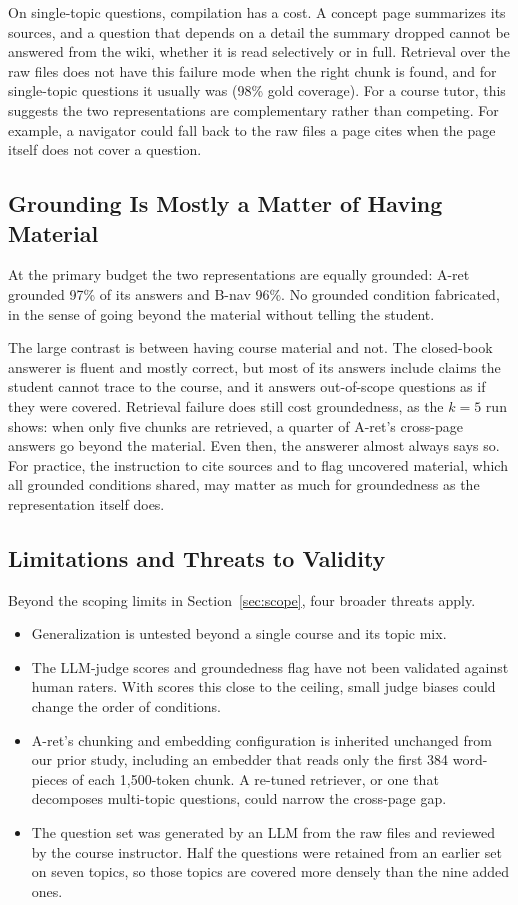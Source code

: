 \documentclass[letterpaper]{article} %
\begin{document}
On single-topic questions, compilation has a cost. A concept page summarizes its sources, and a question that depends on a detail the summary dropped cannot be answered from the wiki, whether it is read selectively or in full. Retrieval over the raw files does not have this failure mode when the right chunk is found, and for single-topic questions it usually was (98\% gold coverage). For a course tutor, this suggests the two representations are complementary rather than competing. For example, a navigator could fall back to the raw files a page cites when the page itself does not cover a question.

\subsection{Grounding Is Mostly a Matter of Having Material}

At the primary budget the two representations are equally grounded: A-ret grounded 97\% of its answers and B-nav 96\%. No grounded condition fabricated, in the sense of going beyond the material without telling the student.

The large contrast is between having course material and not. The closed-book answerer is fluent and mostly correct, but most of its answers include claims the student cannot trace to the course, and it answers out-of-scope questions as if they were covered. Retrieval failure does still cost groundedness, as the $k{=}5$ run shows: when only five chunks are retrieved, a quarter of A-ret's cross-page answers go beyond the material. Even then, the answerer almost always says so. For practice, the instruction to cite sources and to flag uncovered material, which all grounded conditions shared, may matter as much for groundedness as the representation itself does.

\subsection{Limitations and Threats to Validity}

Beyond the scoping limits in Section~\ref{sec:scope}, four broader threats apply.
\begin{itemize}
\item Generalization is untested beyond a single course and its topic mix.
\item The LLM-judge scores and groundedness flag have not been validated against human raters. With scores this close to the ceiling, small judge biases could change the order of conditions.
\item A-ret's chunking and embedding configuration is inherited unchanged from our prior study, including an embedder that reads only the first 384 word-pieces of each 1{,}500-token chunk. A re-tuned retriever, or one that decomposes multi-topic questions, could narrow the cross-page gap.
\item The question set was generated by an LLM from the raw files and reviewed by the course instructor. Half the questions were retained from an earlier set on seven topics, so those topics are covered more densely than the nine added ones.
\end{itemize}
\end{document}
